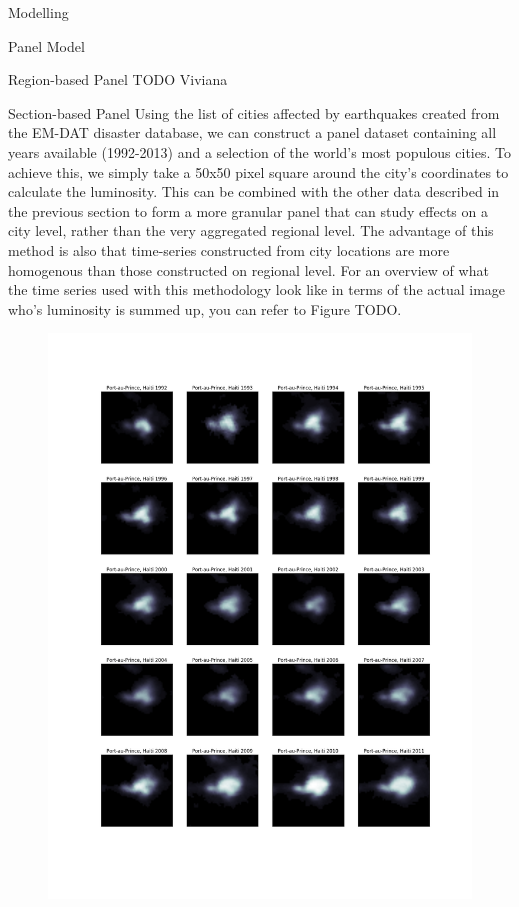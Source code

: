 \documentclass[12pt,fleqn,leqno,letterpaper]{article}
\begin{document}
\begin{section}{Modelling}
  \begin{subsection}{Panel Model}
    \begin{subsubsection}{Region-based Panel}
      TODO Viviana
    \end{subsubsection}
    \begin{subsubsection}{Section-based Panel}
      Using the list of cities affected by earthquakes created from the EM-DAT disaster database, we can construct a panel dataset containing all years available (1992-2013) and a selection of the world's most populous cities. To achieve this, we simply take a 50x50 pixel square around the city's coordinates to calculate the luminosity. This can be combined with the other data described in the previous section to form a more granular panel that can study effects on a city level, rather than the very aggregated regional level. The advantage of this method is also that time-series constructed from city locations are more homogenous than those constructed on regional level. For an overview of what the time series used with this methodology look like in terms of the actual image who's luminosity is summed up, you can refer to Figure TODO.\\
      \begin{figure}
        \centering
        \includegraphics[width=\linewidth]{haiti_luminosity_series}\label{fig:haiti_luminosity_series}

\end{figure}
\end{subsubsection}
\end{subsection}
\end{section}
\end{document}
